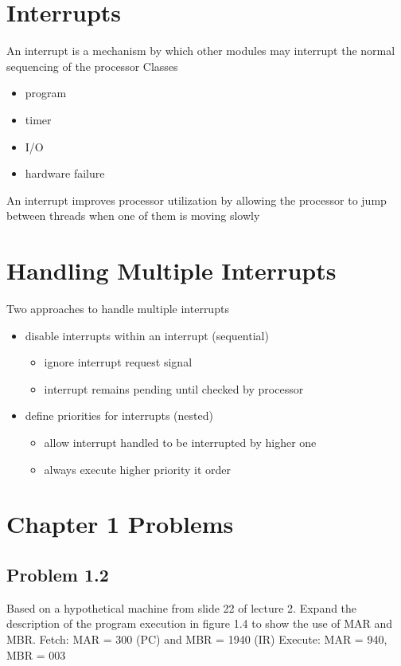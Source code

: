 \documentclass[12pt]{article}
\begin{document}
\section{Interrupts}
An interrupt is a mechanism by which other modules may interrupt the normal sequencing of the processor
Classes
\begin{itemize}
    \item program
    \item timer
    \item I/O
    \item hardware failure
\end{itemize}
An interrupt improves processor utilization by allowing the processor to jump between threads when one of them is moving slowly


\section{Handling Multiple Interrupts}
Two approaches to handle multiple interrupts
\begin{itemize}
    \item disable interrupts within an interrupt (sequential)
    \begin{itemize}
        \item ignore interrupt request signal
        \item interrupt remains pending until checked by processor
    \end{itemize}
    \item define priorities for interrupts (nested)
    \begin{itemize}
        \item allow interrupt handled to be interrupted by higher one
        \item always execute higher priority it order
    \end{itemize}
\end{itemize}


\section{Chapter 1 Problems}
\subsection{Problem 1.2}
Based on a hypothetical machine from slide 22 of lecture 2. Expand the description of the program execution in figure 1.4 to show the use of MAR and MBR.
Fetch: MAR = 300 (PC) and MBR = 1940 (IR)
Execute: MAR = 940, MBR = 003
\end{document}
